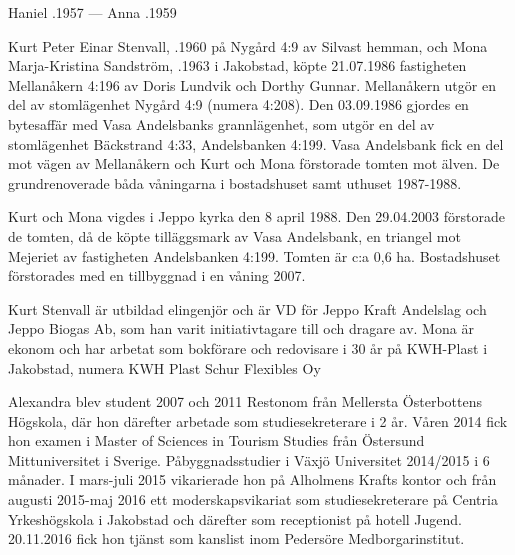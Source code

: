 Haniel .1957  ---  Anna .1959






Kurt Peter Einar Stenvall, .1960 på Nygård 4:9 av Silvast hemman, och Mona Marja-Kristina Sandström, .1963 i 	Jakobstad, köpte 21.07.1986 fastigheten Mellanåkern 4:196 av Doris Lundvik och Dorthy Gunnar. Mellanåkern utgör en del av	stomlägenhet Nygård 4:9 (numera 4:208). Den 03.09.1986 gjordes en bytesaffär med Vasa Andelsbanks grannlägenhet, som utgör en del av stomlägenhet Bäckstrand 4:33, Andelsbanken 4:199. Vasa Andelsbank fick en del mot vägen av Mellanåkern och Kurt och Mona förstorade	tomten mot älven. De grundrenoverade båda våningarna i	bostadshuset samt uthuset 1987-1988.

Kurt och Mona vigdes i Jeppo	kyrka den 8 april 1988. Den 29.04.2003 förstorade de tomten, då de köpte tilläggsmark av Vasa Andelsbank, en triangel mot Mejeriet av fastigheten Andelsbanken 4:199. Tomten är c:a 0,6 ha.	Bostadshuset förstorades med en tillbyggnad i en våning 2007.

Kurt Stenvall är utbildad elingenjör och är VD för Jeppo Kraft Andelslag och Jeppo Biogas Ab, som han varit initiativtagare till och dragare av. Mona är ekonom och har arbetat som bokförare och redovisare i 30 år på	KWH-Plast i Jakobstad, numera KWH Plast Schur Flexibles Oy
\begin{jhchildren}
  \item {}
  \item {}
\end{jhchildren}
Alexandra blev student 2007 och 2011 Restonom från Mellersta Österbottens Högskola, där hon därefter arbetade som studiesekreterare i 2 år. Våren 2014 fick hon examen i Master of Sciences in Tourism Studies från Östersund Mittuniversitet i Sverige.  Påbyggnadsstudier i	Växjö Universitet 2014/2015 i 6 månader. I mars-juli 2015 vikarierade		hon på Alholmens Krafts kontor och från augusti 2015-maj 2016 ett moderskapsvikariat som studiesekreterare på Centria Yrkeshögskola i	Jakobstad och därefter som receptionist på hotell Jugend. 20.11.2016 fick hon tjänst som kanslist inom Pedersöre Medborgarinstitut.

